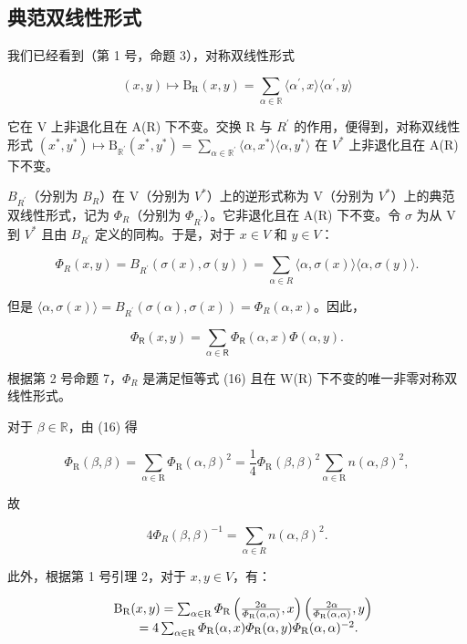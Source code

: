 \subsection{典范双线性形式}

我们已经看到（第 1 号，命题 3），对称双线性形式

\[
(x, y) \mapsto \mathrm{B} _ {\mathrm{R}} (x, y) = \sum_ {\alpha \in \mathbb {R}} \langle \alpha^ {\prime}, x \rangle \langle \alpha^ {\prime}, y \rangle
\]

它在 V 上非退化且在 A(R) 下不变。交换 R 与 \(R^{\prime}\) 的作用，便得到，对称双线性形式 \((x^{*}, y^{*}) \mapsto \mathrm{B}_{\mathbb{R}^{\prime}}(x^{*}, y^{*}) = \sum_{\alpha \in \mathbb{R}^{\prime}} \langle \alpha, x^{*} \rangle \langle \alpha, y^{*} \rangle\) 在 \(V^{*}\) 上非退化且在 A(R) 下不变。

\(B_{R^{\prime}}\)（分别为 \(B_{R}\)）在 V（分别为 \(V^{*}\)）上的逆形式称为 V（分别为 \(V^{*}\)）上的典范双线性形式，记为 \(\Phi_{R}\)（分别为 \(\Phi_{R^{\prime}}\)）。它非退化且在 A(R) 下不变。令 \(\sigma\) 为从 V 到 \(V^{*}\) 且由 \(B_{R^{\prime}}\) 定义的同构。于是，对于 \(x \in V\) 和 \(y \in V\)：

\[
\Phi_ {R} (x, y) = B _ {R ^ {\prime}} (\sigma (x), \sigma (y)) = \sum_ {\alpha \in R} \langle \alpha , \sigma (x) \rangle \langle \alpha , \sigma (y) \rangle .
\]

但是 \(\langle \alpha, \sigma(x) \rangle = B_{R^{\prime}}(\sigma(\alpha), \sigma(x)) = \Phi_R(\alpha, x)\)。因此，

\[
\Phi_ {\mathsf {R}} (x, y) = \sum_ {\alpha \in \mathsf {R}} \Phi_ {\mathsf {R}} (\alpha , x) \Phi (\alpha , y).\tag{16}
\]

根据第 2 号命题 7，\(\Phi_{R}\) 是满足恒等式 (16) 且在 W(R) 下不变的唯一非零对称双线性形式。

对于 \(\beta \in \mathbb{R}\)，由 (16) 得

\[
\varPhi_ {\mathrm{R}} (\beta , \beta) = \sum_ {\alpha \in \mathrm{R}} \varPhi_ {\mathrm{R}} (\alpha , \beta) ^ {2} = \frac {1}{4} \varPhi_ {\mathrm{R}} (\beta , \beta) ^ {2} \sum_ {\alpha \in \mathrm{R}} n (\alpha , \beta) ^ {2},
\]

故

\[
4 \Phi_ {R} (\beta , \beta) ^ {- 1} = \sum_ {\alpha \in R} n (\alpha , \beta) ^ {2}.\tag{17}
\]

此外，根据第 1 号引理 2，对于 \(x, y \in V\)，有：

\[
\begin{array}{r l} & {\mathrm{B} _ {\mathrm{R}} (x, y) = \sum_ {\alpha \in \mathrm{R}} \varPhi_ {\mathrm{R}} \left(\frac {2 \alpha}{\varPhi_ {\mathrm{R}} (\alpha , \alpha)}, x\right) \left(\frac {2 \alpha}{\varPhi_ {\mathrm{R}} (\alpha , \alpha)}, y\right)} \\ & {\qquad = 4 \sum_ {\alpha \in \mathrm{R}} \varPhi_ {\mathrm{R}} (\alpha , x) \varPhi_ {\mathrm{R}} (\alpha , y) \varPhi_ {\mathrm{R}} (\alpha , \alpha) ^ {- 2}.} \end{array}
\]

